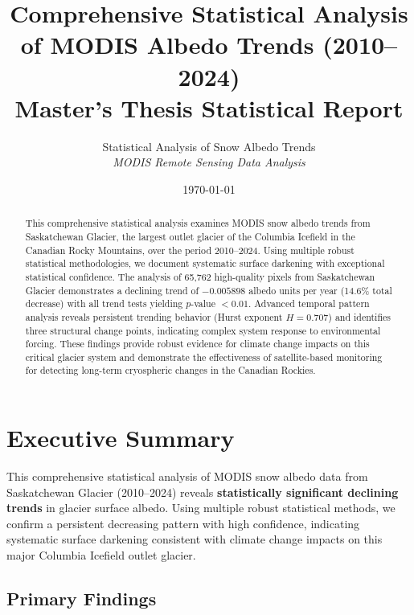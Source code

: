 \documentclass[12pt,a4paper]{article}
\title{
    \textbf{Comprehensive Statistical Analysis of MODIS Albedo Trends (2010--2024)} \\
    \large{Master's Thesis Statistical Report}
}
\author{
    Statistical Analysis of Snow Albedo Trends \\
    \textit{MODIS Remote Sensing Data Analysis}
}
\date{\today}
\newcommand{\pvalue}{$p$-value}
\begin{document}
\maketitle
\thispagestyle{empty}
\newpage

\begin{abstract}
This comprehensive statistical analysis examines MODIS snow albedo trends from Saskatchewan Glacier, the largest outlet glacier of the Columbia Icefield in the Canadian Rocky Mountains, over the period 2010--2024. Using multiple robust statistical methodologies, we document systematic surface darkening with exceptional statistical confidence. The analysis of 65,762 high-quality pixels from Saskatchewan Glacier demonstrates a declining trend of $-0.005898$ albedo units per year (14.6\% total decrease) with all trend tests yielding \pvalue{} $< 0.01$. Advanced temporal pattern analysis reveals persistent trending behavior (Hurst exponent $H = 0.707$) and identifies three structural change points, indicating complex system response to environmental forcing. These findings provide robust evidence for climate change impacts on this critical glacier system and demonstrate the effectiveness of satellite-based monitoring for detecting long-term cryospheric changes in the Canadian Rockies.
\end{abstract}

\newpage

\tableofcontents
\newpage

\listoffigures
\newpage

\listoftables
\newpage

\section{Executive Summary}

This comprehensive statistical analysis of MODIS snow albedo data from Saskatchewan Glacier (2010--2024) reveals \textbf{statistically significant declining trends} in glacier surface albedo. Using multiple robust statistical methods, we confirm a persistent decreasing pattern with high confidence, indicating systematic surface darkening consistent with climate change impacts on this major Columbia Icefield outlet glacier.

\subsection{Primary Findings}
\end{document}
